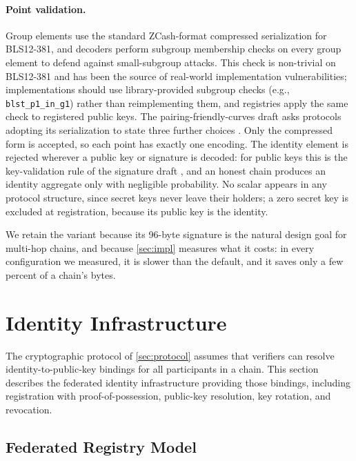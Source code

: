 \documentclass[11pt,a4paper]{article}
\begin{document}
\paragraph{Point validation.}
Group elements use the standard ZCash-format compressed serialization
for BLS12-381, and decoders perform subgroup membership checks on every
group element to defend against small-subgroup attacks. This check is
non-trivial on BLS12-381 and has been the source of real-world
implementation vulnerabilities; implementations should use
library-provided subgroup checks (e.g., \texttt{blst\_p1\_in\_g1})
rather than reimplementing them, and registries apply the same check to
registered public keys. The pairing-friendly-curves draft asks protocols
adopting its serialization to state three further choices
\citep{ietf-pairing-curves}. Only the compressed form is accepted, so
each point has exactly one encoding. The identity element is rejected
wherever a public key or signature is decoded: for public keys this is
the key-validation rule of the signature draft
\citep{ietf-bls-signature}, and an honest chain produces an identity
aggregate only with negligible probability. No scalar appears in any
protocol structure, since secret keys never leave their holders; a zero
secret key is excluded at registration, because its public key is the
identity.

We retain the variant because its 96-byte signature is the natural
design goal for multi-hop chains, and because \cref{sec:impl} measures
what it costs: in every configuration we measured, it is slower than the
default, and it saves only a few percent of a chain's bytes.

\section{Identity Infrastructure}
\label{sec:identity}

The cryptographic protocol of \cref{sec:protocol} assumes that
verifiers can resolve identity-to-public-key bindings for all
participants in a chain. This section describes the federated identity
infrastructure providing those bindings, including registration with
proof-of-possession, public-key resolution, key rotation, and
revocation.

\subsection{Federated Registry Model}
\label{sec:identity-federated}
\end{document}
